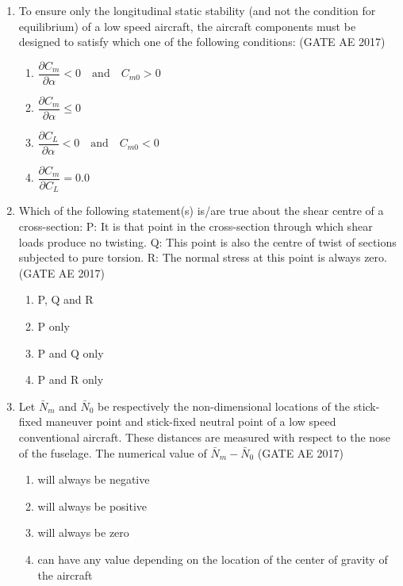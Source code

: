 \documentclass[journal,12pt,onecolumn]{IEEEtran}
\theoremstyle{remark}
\begin{document}
\begin{flushleft}
\begin{enumerate}
\item To ensure only the longitudinal static stability (and not the condition for equilibrium) of a low speed aircraft, the aircraft components must be designed to satisfy which one of the following conditions: \hfill (GATE AE 2017)

\begin{enumerate}
\item $\dfrac{\partial C_m}{\partial \alpha} < 0 \quad \text{and} \quad C_{m0} > 0$
\item $\dfrac{\partial C_m}{\partial \alpha} \leq 0$
\item $\dfrac{\partial C_L}{\partial \alpha} < 0 \quad \text{and} \quad C_{m0} < 0$
\item $\dfrac{\partial C_m}{\partial C_L} = 0.0$
\end{enumerate}


\item Which of the following statement(s) is/are true about the shear centre of a cross-section:  
P: It is that point in the cross-section through which shear loads produce no twisting.  
Q: This point is also the centre of twist of sections subjected to pure torsion.  
R: The normal stress at this point is always zero.  
\hfill (GATE AE 2017)

\begin{enumerate}
\item P, Q and R
\item P only
\item P and Q only
\item P and R only
\end{enumerate}

\item Let $\bar{N}_m$ and $\bar{N}_0$ be respectively the non-dimensional locations of the stick-fixed maneuver point and stick-fixed neutral point of a low speed conventional aircraft. These distances are measured with respect to the nose of the fuselage. The numerical value of $\bar{N}_m - \bar{N}_0$ 
\hfill (GATE AE 2017)

\begin{multicols}{2}
\begin{enumerate}
\item will always be negative
\item will always be positive
\item will always be zero
\item can have any value depending on the location of the center of gravity of the aircraft
\end{enumerate}
\end{multicols}


\end{enumerate}
\end{flushleft}
\end{document}
